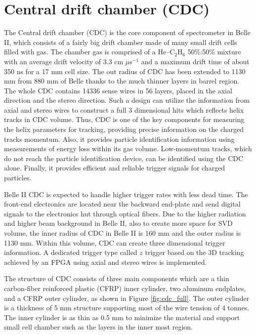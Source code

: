 \section{Central drift chamber (CDC)}
The Central drift chamber (CDC) is the core component of spectrometer in Belle II, which consists of a fairly big drift chamber made of many small drift cells filled with gas. The chamber
gas is comprised of a He–C$_2$H$_6$ 50\%:50\% mixture with an average drift velocity of 3.3 cm $\mu$s$^{-1}$ and a
maximum drift time of about 350 ns for a 17 mm cell size.
The out radius of CDC has been extended to 1130 mm from 880 mm of Belle thanks to the much thinner layers in barrel region. The whole CDC contains 14336 sense wires in 56 layers, placed in the axial direction and the stereo direction\cite{Abe:2010gxa}\cite{b2book}. Such a design can utilize the information from axial and stereo wires to construct a full 3 dimensional hits which reflects helix tracks in CDC volume. Thus, CDC is one of the key components for measuring the helix parameters for tracking, providing precise information on the charged tracks momentum. Also, it provides particle identification information using measurements of energy loss within its gas volume. Low-momentum tracks, which do not reach the particle identification device, can be identified using
the CDC alone. Finally, it provides efficient and reliable trigger signals for charged particles.

Belle II CDC is expected to handle higher trigger rates with less dead time. The front-end electronics are located near the backward end-plate and send digital signals to the
electronics hut through optical fibers. Due to the higher radiation and higher beam background in Belle II, also to create more space for SVD volume, the inner radius of CDC in Belle II is 160 mm and the outer radius is 1130 mm. Within this volume, CDC can create three dimensional trigger information. A dedicated trigger type called $z$ trigger\cite{Abe:2010gxa} based on the 3D tracking achieved by an FPGA using axial and stereo wires is implemented. 

The structure of CDC consists of three main components which are a thin carbon-fiber reinforced
plastic (CFRP) inner cylinder, two aluminum endplates, and a CFRP outer cylinder, as shown in Figure \ref{fig:cdc_full}. The outer cylinder is a thickness of 5 mm structure supporting most of the wire tension of 4 tonnes. The inner cylinder is as thin as 0.5 mm to minimize the material and support small cell chamber such as the layers in the inner most region. 

